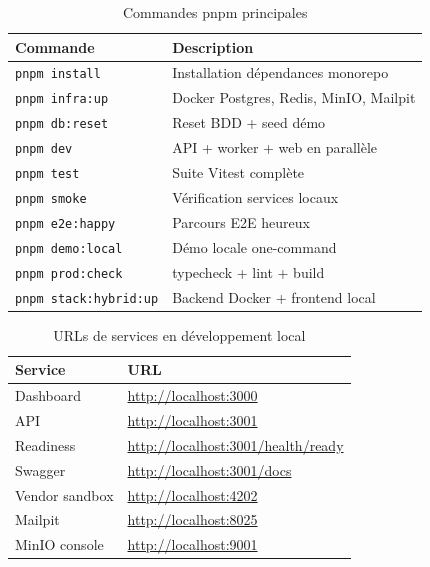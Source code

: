 \begin{table}[H]
\centering
\caption{Commandes pnpm principales}
\label{tab:commands}
\begin{tabularx}{\textwidth}{@{}p{4.2cm}X@{}}
\toprule
\textbf{Commande} & \textbf{Description} \\
\midrule
\rowcolor{rowgray}
\texttt{pnpm install} & Installation dépendances monorepo \\
\texttt{pnpm infra:up} & Docker Postgres, Redis, MinIO, Mailpit \\
\rowcolor{rowgray}
\texttt{pnpm db:reset} & Reset BDD + seed démo \\
\texttt{pnpm dev} & API + worker + web en parallèle \\
\rowcolor{rowgray}
\texttt{pnpm test} & Suite Vitest complète \\
\texttt{pnpm smoke} & Vérification services locaux \\
\rowcolor{rowgray}
\texttt{pnpm e2e:happy} & Parcours E2E heureux \\
\texttt{pnpm demo:local} & Démo locale one-command \\
\rowcolor{rowgray}
\texttt{pnpm prod:check} & typecheck + lint + build \\
\texttt{pnpm stack:hybrid:up} & Backend Docker + frontend local \\
\bottomrule
\end{tabularx}
\end{table}

\begin{table}[H]
\centering
\caption{URLs de services en développement local}
\label{tab:urls}
\begin{tabularx}{\textwidth}{@{}p{3.2cm}X@{}}
\toprule
\textbf{Service} & \textbf{URL} \\
\midrule
\rowcolor{rowgray}
Dashboard & \url{http://localhost:3000} \\
API & \url{http://localhost:3001} \\
\rowcolor{rowgray}
Readiness & \url{http://localhost:3001/health/ready} \\
Swagger & \url{http://localhost:3001/docs} \\
\rowcolor{rowgray}
Vendor sandbox & \url{http://localhost:4202} \\
Mailpit & \url{http://localhost:8025} \\
\rowcolor{rowgray}
MinIO console & \url{http://localhost:9001} \\
\bottomrule
\end{tabularx}
\end{table}
